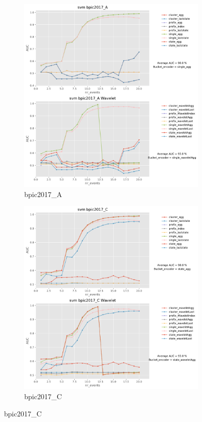 \documentclass[twoside,11pt]{Latex/Classes/PhDthesisPSnPDF}
\begin{document}
\begin{figure}[!htbp] %
	
	\begin{subfigure}{0.48\textwidth}
		\includegraphics[width=\linewidth]{images/wavelet/graphs2svm/bpic2017_A.pdf}
		\caption{bpic2017\_A} 
	\end{subfigure}\hspace*{\fill}
	\begin{subfigure}{0.48\textwidth}
		\includegraphics[width=\linewidth]{images/wavelet/graphs2svm/bpic2017_C.pdf}
		\caption{bpic2017\_C}
	\end{subfigure}
	

\end{figure}
\end{document}
